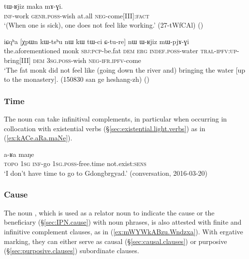 \begin{exe}
\ex  \label{ex:kAnAma.tWRjiz}
\gll [kɤ-nɤma] tɯ-ʁjiz maka mɤ-ɣi. \\
\textsc{inf}-work \textsc{genr}.\textsc{poss}-wish at.all \textsc{neg}-come[III]:\textsc{fact} \\
\glt `(When one is sick), one does not feel like working.' (27-tWfCAl)
()
\end{exe}

\begin{exe}
\ex  \label{ex:Cture.WRjiz}
\gll  iɕqʰa [χpɯn kɯ-tsʰu nɯ kɯ tɯ-ci ɕ-tu-re] nɯ ɯ-ʁjiz mɯ-pjɤ-ɣi  \\
the.aforementioned monk \textsc{sbj}:\textsc{pcp}-be.fat \textsc{dem} \textsc{erg} \textsc{indef}.\textsc{poss}-water \textsc{tral}-\textsc{ipfv}:\textsc{up}-bring[III] \textsc{dem} \textsc{3sg}.\textsc{poss}-wish \textsc{neg}-\textsc{ifr}.\textsc{ipfv}-come  \\
\glt `The fat monk did not feel like (going down the river and) bringing the water [up to the monastery]. (150830 san ge heshang-zh)
()
\end{exe} 
 
 
\subsubsection{Time} \label{sec:free.time.complement}
The noun  can take infinitival complements, in particular when occurring in collocation with existential verbs (§\ref{sec:existential.light.verbs}) as in (\ref{ex:kACe.aRa.maNe}). 
 
\begin{exe}
\ex  \label{ex:kACe.aRa.maNe}
 a-ʁa maŋe \\
\textsc{topo} \textsc{1sg} \textsc{inf}-go \textsc{1sg}.\textsc{poss}-free.time not.exist:\textsc{sens} \\
\glt `I don't have time to go to Gdongbrgyad.' (conversation, 2016-03-20)
\end{exe} 

 
\subsubsection{Cause} \label{sec:nouns.cause.complement}
The noun , which is used as a relator noun to indicate the cause or the beneficiary (§\ref{sec:IPN.cause}) with noun phrases, is also attested with finite and infinitive complement clauses, as in (\ref{ex:mWYWkABzu.Wndzxa}). With ergative marking, they can either serve as causal (§\ref{sec:causal.clauses}) or purposive (§\ref{sec:purposive.clauses}) subordinate clauses.


